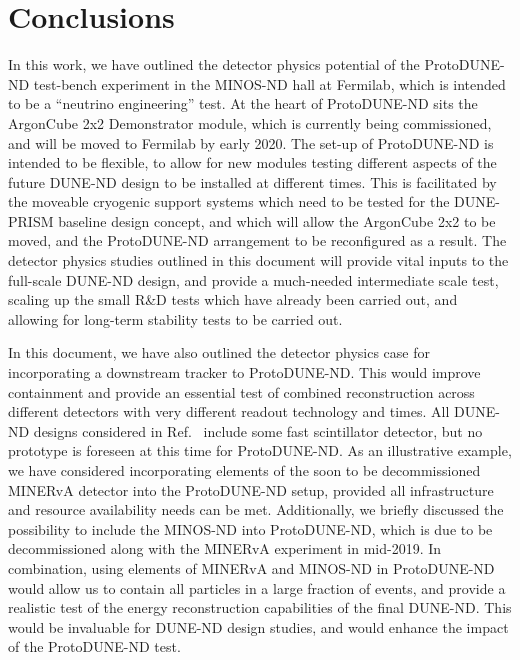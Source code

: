\section{Conclusions}
\label{sec:conclusions}

In this work, we have outlined the detector physics potential of the ProtoDUNE-ND test-bench experiment in the MINOS-ND hall at Fermilab, which is intended to be a ``neutrino engineering'' test. At the heart of ProtoDUNE-ND sits the ArgonCube 2x2 Demonstrator module, which is currently being commissioned, and will be moved to Fermilab by early 2020. The set-up of ProtoDUNE-ND is intended to be flexible, to allow for new modules testing different aspects of the future DUNE-ND design to be installed at different times. This is facilitated by the moveable cryogenic support systems which need to be tested for the DUNE-PRISM baseline design concept, and which will allow the ArgonCube 2x2 to be moved, and the ProtoDUNE-ND arrangement to be reconfigured as a result. The detector physics studies outlined in this document will provide vital inputs to the full-scale DUNE-ND design, and provide a much-needed intermediate scale test, scaling up the small R\&D tests which have already been carried out, and allowing for long-term stability tests to be carried out.

In this document, we have also outlined the detector physics case for incorporating a downstream tracker to ProtoDUNE-ND. 
This would improve containment and provide an essential test of combined reconstruction across different detectors with very different readout technology and times. 
All DUNE-ND designs considered in Ref.~\cite{dune_ndcsg} include some fast scintillator detector, but no prototype is foreseen at this time for ProtoDUNE-ND. 
As an illustrative example, we have considered incorporating elements of the soon to be decommissioned MINERvA detector into the ProtoDUNE-ND setup, provided all infrastructure and resource availability needs can be met. 
Additionally, we briefly discussed the possibility to include the MINOS-ND into ProtoDUNE-ND, which is due to be decommissioned along with the MINERvA experiment in mid-2019. In combination, using elements of MINERvA and MINOS-ND in ProtoDUNE-ND would allow us to contain all particles in a large fraction of events, and provide a realistic test of the energy reconstruction capabilities of the final DUNE-ND. This would be invaluable for DUNE-ND design studies, and would enhance the impact of the ProtoDUNE-ND test.
